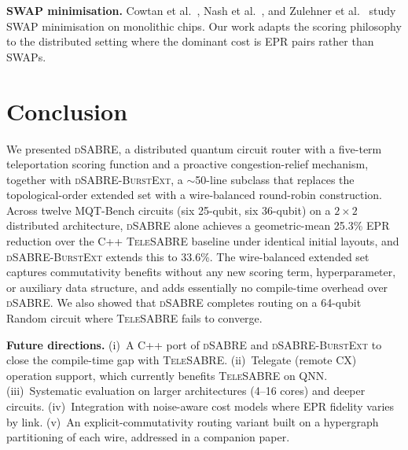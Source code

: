 \documentclass[conference]{IEEEtran}
\newcommand{\dSABRE}{\textsc{dSABRE}}
\newcommand{\BurstExt}{\textsc{dSABRE-BurstExt}}
\newcommand{\TeleSABRE}{\textsc{TeleSABRE}}
\begin{document}
\textbf{SWAP minimisation.}
Cowtan et al.~\cite{cowtan2019phase}, Nash et al.~\cite{nash2020optimal}, and
Zulehner et al.~\cite{zulehner2018efficient} study SWAP minimisation on
monolithic chips.
Our work adapts the scoring philosophy to the distributed setting where the
dominant cost is EPR pairs rather than SWAPs.

\section{Conclusion}
\label{sec:conclusion}

We presented \dSABRE{}, a distributed quantum circuit router with a five-term
teleportation scoring function and a proactive congestion-relief mechanism,
together with \BurstExt{}, a $\sim$50-line subclass that replaces the
topological-order extended set with a wire-balanced round-robin
construction.
Across twelve MQT-Bench circuits (six 25-qubit, six 36-qubit) on a
$2\!\times\!2$ distributed architecture, \dSABRE{} alone achieves a
geometric-mean 25.3\% EPR reduction over the C++ \TeleSABRE{} baseline
under identical initial layouts, and \BurstExt{} extends this to 33.6\%.
The wire-balanced extended set captures commutativity benefits without any
new scoring term, hyperparameter, or auxiliary data structure, and adds
essentially no compile-time overhead over \dSABRE{}.
We also showed that \dSABRE{} completes routing on a 64-qubit Random circuit
where \TeleSABRE{} fails to converge.

\textbf{Future directions.}
(i)~A C++ port of \dSABRE{} and \BurstExt{} to close the compile-time gap
with \TeleSABRE{}.
(ii)~Telegate (remote CX) operation support, which currently benefits
\TeleSABRE{} on QNN.
(iii)~Systematic evaluation on larger architectures (4--16 cores) and
deeper circuits.
(iv)~Integration with noise-aware cost models where EPR fidelity varies by link.
(v)~An explicit-commutativity routing variant built on a hypergraph
partitioning of each wire, addressed in a companion paper.



\end{document}
